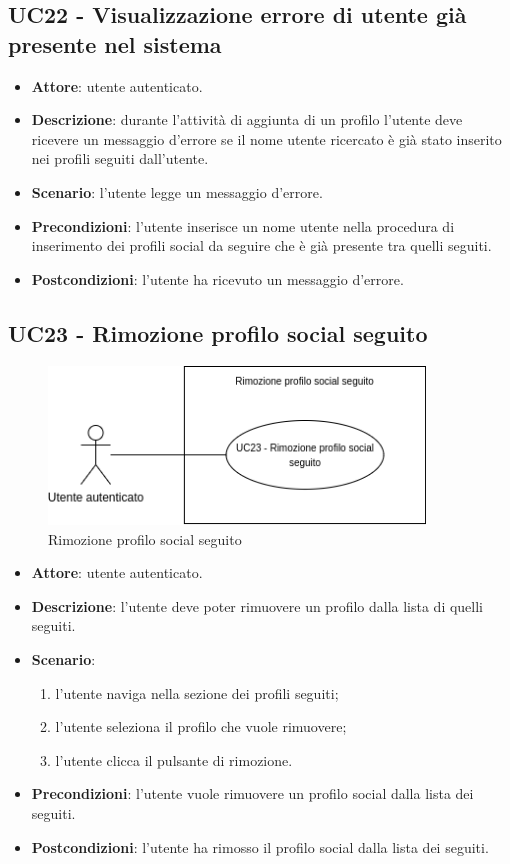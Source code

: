 \subsection{UC22 - Visualizzazione errore di utente già presente nel sistema}
\begin{itemize}
    \item \textbf{Attore}: utente autenticato.
    \item \textbf{Descrizione}: durante l'attività di aggiunta di un profilo l'utente deve ricevere un messaggio d'errore se il nome utente ricercato è già stato inserito nei profili seguiti dall'utente.
    \item \textbf{Scenario}: l'utente legge un messaggio d'errore. 
    \item \textbf{Precondizioni}: l'utente inserisce un nome utente nella procedura di inserimento dei profili social da seguire che è già presente tra quelli seguiti.
    \item \textbf{Postcondizioni}: l'utente ha ricevuto un messaggio d'errore.
\end{itemize}

\subsection{UC23 - Rimozione profilo social seguito}

\begin{figure}[!h]
    \includegraphics[width=10cm]{sezioni/Images/UC23.png}
    \centering
    \caption{Rimozione profilo social seguito}
\end{figure}

\begin{itemize}
    \item \textbf{Attore}: utente autenticato.
    \item \textbf{Descrizione}: l'utente deve poter rimuovere un profilo dalla lista di quelli seguiti.
    \item \textbf{Scenario}:
    \begin{enumerate}
        \item l'utente naviga nella sezione dei profili seguiti;
        \item l'utente seleziona il profilo che vuole rimuovere;
        \item l'utente clicca il pulsante di rimozione.
    \end{enumerate}

    \item \textbf{Precondizioni}: l'utente vuole rimuovere un profilo social dalla lista dei seguiti.
    \item \textbf{Postcondizioni}: l'utente ha rimosso il profilo social dalla lista dei seguiti.
\end{itemize}

